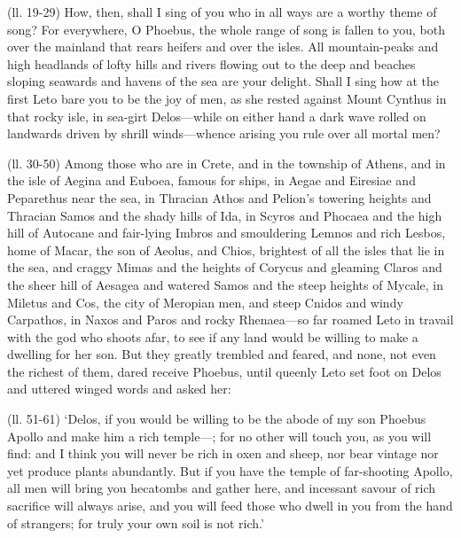 (ll. 19-29) How, then, shall I sing of you who in all ways are a worthy theme
of song? For everywhere, O Phoebus, the whole range of song is fallen to you,
both over the mainland that rears heifers and over the isles. All
mountain-peaks and high headlands of lofty hills and rivers flowing out to the
deep and beaches sloping seawards and havens of the sea are your delight. Shall
I sing how at the first Leto bare you to be the joy of men, as she rested
against Mount Cynthus in that rocky isle, in sea-girt Delos—while on
either hand a dark wave rolled on landwards driven by shrill winds—whence
arising you rule over all mortal men?

(ll. 30-50) Among those who are in Crete, and in the township of Athens, and in
the isle of Aegina and Euboea, famous for ships, in Aegae and Eiresiae and
Peparethus near the sea, in Thracian Athos and Pelion’s towering heights
and Thracian Samos and the shady hills of Ida, in Scyros and Phocaea and the
high hill of Autocane and fair-lying Imbros and smouldering Lemnos and rich
Lesbos, home of Macar, the son of Aeolus, and Chios, brightest of all the isles
that lie in the sea, and craggy Mimas and the heights of Corycus and gleaming
Claros and the sheer hill of Aesagea and watered Samos and the steep heights of
Mycale, in Miletus and Cos, the city of Meropian men, and steep Cnidos and
windy Carpathos, in Naxos and Paros and rocky Rhenaea—so far roamed Leto
in travail with the god who shoots afar, to see if any land would be willing to
make a dwelling for her son. But they greatly trembled and feared, and none,
not even the richest of them, dared receive Phoebus, until queenly Leto set
foot on Delos and uttered winged words and asked her:

(ll. 51-61) ‘Delos, if you would be willing to be the abode of my son
Phoebus Apollo and make him a rich temple—; for no other will touch you,
as you will find: and I think you will never be rich in oxen and sheep, nor
bear vintage nor yet produce plants abundantly. But if you have the temple of
far-shooting Apollo, all men will bring you hecatombs and gather here, and
incessant savour of rich sacrifice will always arise, and you will feed those
who dwell in you from the hand of strangers; for truly your own soil is not
rich.’

